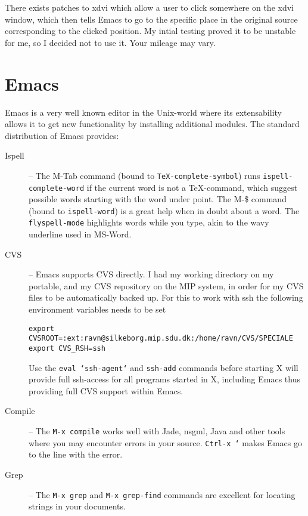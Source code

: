 There exists patches to xdvi which allow a user to click somewhere on
the xdvi window, which then tells Emacs to go to the specific place in
the original source corresponding to the clicked position.  My intial
testing proved it to be unstable for me, so I decided not to use it.
Your mileage may vary.



\section{Emacs} 
\label{sec:report-writing-tools-emacs} 


Emacs is a very well known editor in the Unix-world where its
extensability allows it to get new functionality by installing
additional modules.  The standard distribution of Emacs provides:

\begin{description}
\item[Ispell] -- The M-Tab command (bound to
  \texttt{TeX-complete-symbol}) runs \texttt{ispell-complete-word} if
  the current word is not a {\TeX}-command, which suggest possible
  words starting with the word under point.  The M-\$ command (bound
  to \texttt{ispell-word}) is a great help when in doubt about a
  word.  The \texttt{flyspell-mode} highlights words while you type,
  akin to the wavy underline used in MS-Word. 

\item[CVS] -- Emacs supports CVS directly.  I
  had my working directory on my portable, and my CVS repository on
  the MIP system, in order for my CVS files to be automatically backed
  up.  For this to work with ssh the following environment variables
  needs to be set
\begin{verbatim}
export CVSROOT=:ext:ravn@silkeborg.mip.sdu.dk:/home/ravn/CVS/SPECIALE
export CVS_RSH=ssh
\end{verbatim}
Use the \texttt{eval `ssh-agent`} and \texttt{ssh-add} commands before
starting X will provide full ssh-access for all programs started in X,
including Emacs thus providing full CVS support within Emacs.

\item[Compile] -- The \texttt{M-x compile} works well with Jade,
  nsgml, Java and other tools where you may encounter errors in your
  source.  \texttt{Ctrl-x `} makes Emacs go to the line with the
  error.
\item[Grep] -- The \texttt{M-x grep} and \texttt{M-x grep-find}
  commands are excellent for locating strings in your documents.
\end{description}

